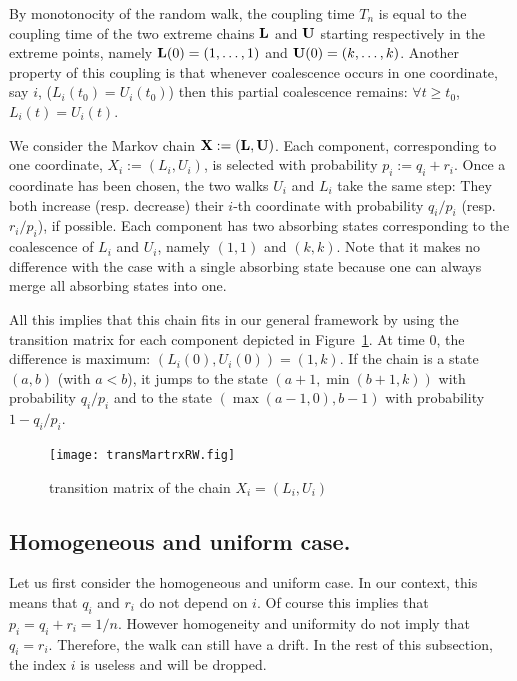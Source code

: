 \documentclass{aptpub}
\newcommand{\bydef}{:=}
\begin{document}
By monotonocity of the random walk, the coupling time $T_n$ is equal
to the coupling time of the two extreme chains ${\bf L}$ and ${\bf U}$ starting
respectively in the extreme points, namely ${\bf L}(0) = (1,\dots,1)$ and
${\bf U}(0) = (k,\dots,k)$.  Another property of this coupling is that
whenever coalescence occurs in one coordinate, say $i$,
($L_i(t_0) = U_i(t_0)$) then this partial coalescence remains:
$\forall t \ge t_0$, $L_i(t) = U_i(t)$.


We consider the Markov chain $\bf X \bydef ({\bf L,U})$.  Each component,
corresponding to one coordinate, $X_i := (L_i,U_i)$, is selected with
probability $p_i := q_i + r_i $.  Once a coordinate has been chosen,
the two walks $U_i$ and $L_i$ take the same step: They both increase
(resp. decrease) their $i$-th coordinate with probability $q_i/p_i$
(resp. $r_i/p_i$), if possible.  Each component has two absorbing states
corresponding to the coalescence of $L_i$ and $U_i$, namely $(1,1)$
and $(k,k)$.  Note that it makes no difference with the case with a
single absorbing state because one can always merge all absorbing
states into one.

All this implies that this chain fits in our general framework by using the
transition matrix for each component depicted in Figure~\ref{fig:rw1}.
At time $0$, the difference is maximum: $(L_i(0),U_i(0))=(1,k)$.  If
the chain is a state $(a,b)$ (with $a<b$), it jumps to the state
$(a+1,\min(b+1,k))$ with probability $q_i/p_i$ and to the state
$(\max(a-1,0),b-1)$ with probability $1-q_i/p_i$. 


\begin{figure}[hbtp]
  \centering
\texttt{[image: transMartrxRW.fig]}
\caption{transition matrix of the chain $X_i = (L_i,U_i)$}
\label{fig:rw1}
\end{figure}





\subsection{Homogeneous and uniform case.}
Let us first consider the homogeneous and uniform case.  In our
context, this means that $q_i$ and $r_i$ do not depend on $i$.  Of
course this implies that $p_i = q_i+ r_i = 1/n$.  However homogeneity
and uniformity do not imply that $q_i = r_i$. Therefore, the walk can
still have a drift.  In the rest of this subsection, the index $i$ is
useless and will be dropped.
\end{document}
